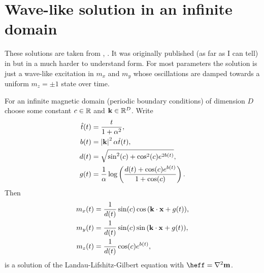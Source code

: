 


\section{Wave-like solution in an infinite domain}
\label{sec:wave-like-solution}

These solutions are taken from \cite{Jeong2014}, \cite{Fuwa2006}. It was originally published (as far as I can tell) in \cite{Lakshmanan1976} but in a much harder to understand form.
For most parameters the solution is just a wave-like excitation in $m_x$ and $m_y$ whose oscillations are damped towards a uniform $m_z = \pm 1$ state over time.

For an infinite magnetic domain (\ie periodic boundary conditions) of dimension $D$ choose some constant $c \in \mathbb{R}$ and $\mathbf{k} \in \mathbb{R}^D$.
Write
\begin{equation}
  \begin{aligned}
    \hat{t}(t) &= \frac{t}{1 + \alpha^2}, \\
    b(t) &= \left|{\mathbf{k}} \right|^2 \alpha \hat{t}(t), \\
    d(t) &= \sqrt{\sin^2(c) + \cos^2(c)e^{2 b(t)}}, \\
    g(t) &= \frac{1}{\alpha} \log \left( \frac{d(t) + \cos(c) e^{b(t)}}{1 + \cos(c)} \right).
  \end{aligned}
\end{equation}
Then
\begin{equation}
  \begin{aligned}
    m_x(t) &= \frac{1}{d(t)} \sin(c) \cos{\left( \mathbf{k}\cdot \mathbf{x}+ g(t)  \right)}, \\
    m_y(t) &= \frac{1}{d(t)} \sin(c) \sin{\left( \mathbf{k}\cdot \mathbf{x}+ g(t)  \right)}, \\
    m_z(t) &= \frac{1}{d(t)} \cos(c) e^{b(t)},
  \end{aligned}
\end{equation}
is a solution of the Landau-Lifshitz-Gilbert equation with $\heff = \lap \mv$.

